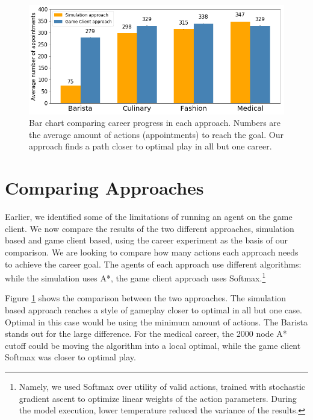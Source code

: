 \documentclass[letterpaper]{article} %
\begin{document}
\begin{figure}[t]
  \centering
  \includegraphics[width=1.0\linewidth]{images/career_approach_comparison.png}
  \caption{Bar chart comparing career progress in each approach. Numbers are the average amount of actions (appointments) to reach the goal. Our approach finds a path closer to optimal play in all but one career.}
  \label{Figure:career_approach_comp}
\end{figure}

\section{Comparing Approaches}

Earlier, we identified some of the limitations of running an agent on the game client. We now compare the results of the two different approaches, simulation based and  game client based, using the career experiment as the basis of our comparison. We are looking to compare how many actions each approach needs to achieve the career goal. The agents of each approach use different algorithms: while the simulation uses A*, the game client approach uses Softmax.\footnote{Namely, we used Softmax over utility of valid actions, trained with stochastic gradient ascent to optimize linear weights of the action parameters. 
During the model execution, lower temperature reduced the variance of the results.
}

Figure \ref{Figure:career_approach_comp} shows the comparison between the two approaches. The simulation based approach reaches a style of gameplay closer to optimal in all but one case. Optimal in this case would be using the minimum amount of actions. The Barista stands out for the large difference. For the medical career, the 2000 node A* cutoff could be moving the algorithm into a local optimal, while the game client Softmax was closer to optimal play.
\end{document}
